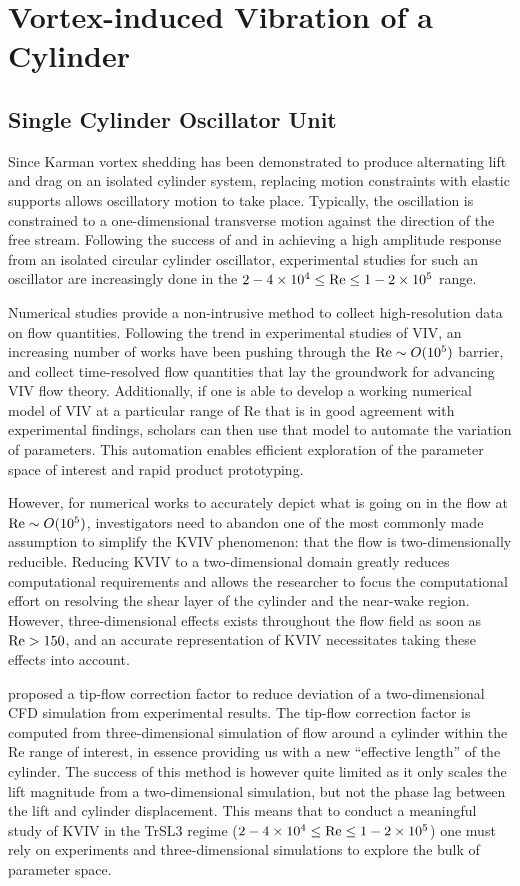 \documentclass[oneside]{utmthesis}
\begin{document}
\section{Vortex-induced Vibration of a Cylinder} \label{sec:cylinderVIV}
\subsection{Single Cylinder Oscillator Unit} \label{ssec:singleCylinderOscillator}
Since Karman vortex shedding has been demonstrated to produce alternating lift and drag on an isolated cylinder system, replacing motion constraints with elastic supports allows oscillatory motion to take place. Typically, the oscillation is constrained to a one-dimensional transverse motion against the direction of the free stream. Following the success of \citet{Raghavan2007} and  \citet{Bernitsas2008a,Bernitsas2008b} in achieving a high amplitude response from an isolated circular cylinder oscillator, experimental studies for such an oscillator are increasingly done in the $2 - 4 \times 10^{4} \leq \text{Re} \leq 1 - 2 \times 10^{5}$ range.

Numerical studies provide a non-intrusive method to collect high-resolution data on flow quantities. Following the trend in experimental studies of VIV, an increasing number of works have been pushing through the $\text{Re} \sim O(10^{5})$ barrier, and collect time-resolved flow quantities that lay the groundwork for advancing VIV flow theory. Additionally, if one is able to develop a working numerical model of VIV at a particular range of Re that is in good agreement with experimental findings, scholars can then use that model to automate the variation of parameters. This automation enables efficient exploration of the parameter space of interest and rapid product prototyping.

However, for numerical works to accurately depict what is going on in the flow at $\text{Re} \sim O(10^{5})$, investigators need to abandon one of the most commonly made assumption to simplify the KVIV phenomenon: that the flow is two-dimensionally reducible. Reducing KVIV to a two-dimensional domain greatly reduces computational requirements and allows the researcher to focus the computational effort on resolving the shear layer of the cylinder and the near-wake region. However, three-dimensional effects exists throughout the flow field as soon as $\text{Re} > 150$, and an accurate representation of KVIV necessitates taking these effects into account.

\citet{Kinaci2016} proposed a tip-flow correction factor to reduce deviation of a two-dimensional CFD simulation from experimental results. The tip-flow correction factor is computed from three-dimensional simulation of flow around a cylinder within the Re range of interest, in essence providing us with a new ``effective length'' of the cylinder. The success of this method is however quite limited as it only scales the lift magnitude from a two-dimensional simulation, but not the phase lag between the lift and cylinder displacement. This means that to conduct a meaningful study of KVIV in the TrSL3 regime ($2 - 4 \times 10^{4} \leq \text{Re} \leq 1 - 2 \times 10^{5}$) one must rely on experiments and three-dimensional simulations to explore the bulk of parameter space.
\end{document}
